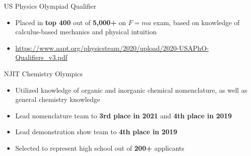 \documentclass[12]{article}
\begin{document}
{US Physics Olympiad Qualifier}
{
  \begin{itemize}
  \item Placed in \textbf{top 400} out of \textbf{5,000+} on $F=ma$ exam, based on knowledge of calculus-based mechanics and physical intuition
  \item \url{https://www.aapt.org/physicsteam/2020/upload/2020-USAPhO-Qualifiers\_v3.pdf}
  \end{itemize}
}
\vspace{-1\baselineskip}
{NJIT Chemistry Olympics}
{
  \begin{itemize}
  \item Utilized knowledge of organic and inorganic chemical nomenclature, as well as general chemistry knowledge
  \item Lead nomenclature team to \textbf{3rd place in 2021} and \textbf{4th place in 2019}
  \item Lead demonstration show team to \textbf{4th place in 2019}
  \item Selected to represent high school out of \textbf{200+} applicants
  \end{itemize}
}
\end{document}
